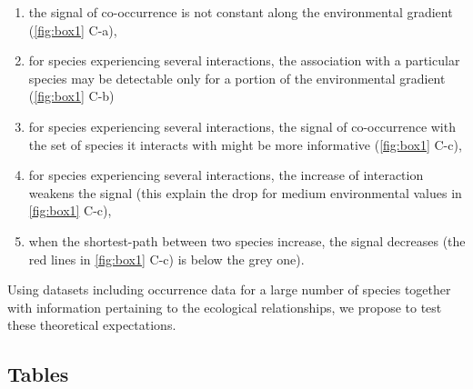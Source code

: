 \begin{enumerate}
\def\labelenumi{\arabic{enumi}.}
\tightlist
\item
  the signal of co-occurrence is not constant along the environmental
  gradient (\ref{fig:box1} C-a),
\item
  for species experiencing several interactions, the association with a
  particular species may be detectable only for a portion of the
  environmental gradient (\ref{fig:box1} C-b)
\item
  for species experiencing several interactions, the signal of
  co-occurrence with the set of species it interacts with might be more
  informative (\ref{fig:box1} C-c),
\item
  for species experiencing several interactions, the increase of
  interaction weakens the signal (this explain the drop for medium
  environmental values in \ref{fig:box1} C-c),
\item
  when the shortest-path between two species increase, the signal
  decreases (the red lines in \ref{fig:box1} C-c) is below the grey
  one).
\end{enumerate}

Using datasets including occurrence data for a large number of species
together with information pertaining to the ecological relationships, we
propose to test these theoretical expectations.

\newpage

\subsection{Tables}\label{tables}

